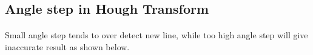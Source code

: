 \documentclass[12pt,a4paper]{report}
\begin{document}


\clearpage


\subsection{Angle step in Hough Transform}
\paragraph*{}
Small angle step tends to over detect new line, while too high angle step will give inaccurate result as shown below.
\end{document}
